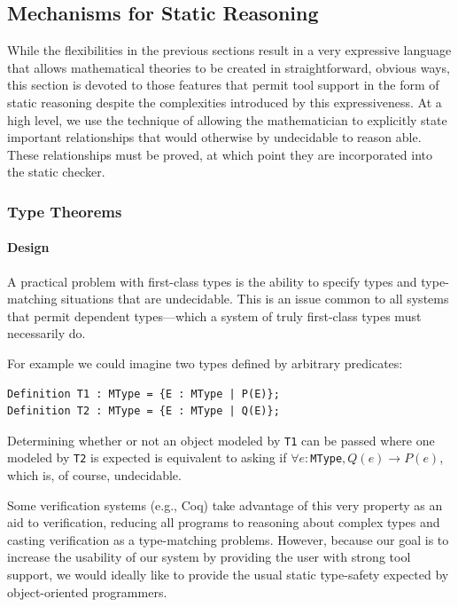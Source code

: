 	\subsection{Mechanisms for Static Reasoning\label{staticReasoning}}

While the flexibilities in the previous sections result in a very expressive language that allows mathematical theories to be created in straightforward, obvious ways, this section is devoted to those features that permit tool support in the form of static reasoning despite the complexities introduced by this expressiveness.  At a high level, we use the technique of allowing the mathematician to explicitly state important relationships that would otherwise by undecidable to reason able.  These relationships must be proved, at which point they are incorporated into the static checker.

		\subsubsection{Type Theorems\label{typeTheorems}}

\paragraph{Design\label{typeTheoremDesign}}
A practical problem with first-class types is the ability to specify types and type-matching situations that are undecidable.  This is an issue common to all systems that permit dependent types---which a system of truly first-class types must necessarily do.

For example we could imagine two types defined by arbitrary predicates:

\begin{lstlisting}
Definition T1 : MType = {E : MType | P(E)};
Definition T2 : MType = {E : MType | Q(E)};
\end{lstlisting}

Determining whether or not an object modeled by \texttt{T1} can be passed where one modeled by \texttt{T2} is expected is equivalent to asking if $\forall e : $\texttt{MType}$, Q(e) \rightarrow P(e)$, which is, of course, undecidable.

Some verification systems (e.g., Coq) take advantage of this very property as an aid to verification, reducing all programs to reasoning about complex types and casting verification as a type-matching problems.  However, because our goal is to increase the usability of our system by providing the user with strong tool support, we would ideally like to provide the usual static type-safety expected by object-oriented programmers.

